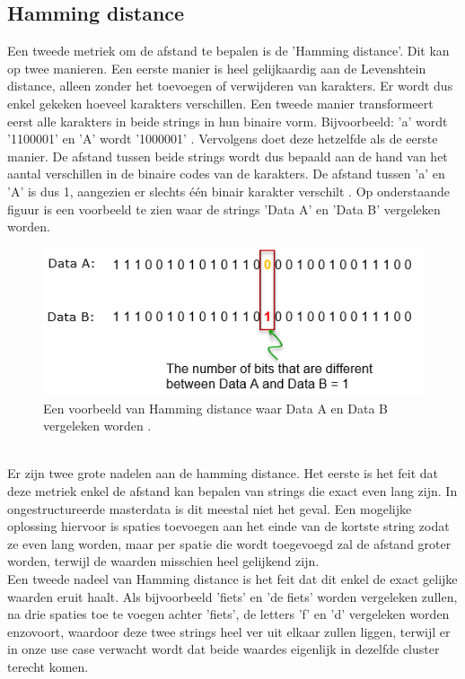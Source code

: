 \subsection{Hamming distance}
Een tweede metriek om de afstand te bepalen is de 'Hamming distance'. Dit kan op twee manieren. Een eerste manier is heel gelijkaardig aan de Levenshtein distance, alleen zonder het toevoegen of verwijderen van karakters. Er wordt dus enkel gekeken hoeveel karakters verschillen. Een tweede manier transformeert eerst alle karakters in beide strings in hun binaire vorm. Bijvoorbeeld: 'a' wordt '1100001' en 'A' wordt '1000001' \autocite{Includehelp}. Vervolgens doet deze hetzelfde als de eerste manier. De afstand tussen beide strings wordt dus bepaald aan de hand van het aantal verschillen in de binaire codes van de karakters. De afstand tussen 'a' en 'A' is dus 1, aangezien er slechts één binair karakter verschilt \autocite{Silva2022}. Op onderstaande figuur is een voorbeeld te zien waar de strings 'Data A' en 'Data B' vergeleken worden.
\begin{figure}[h]
    \centering
    \includegraphics[width=0.7\linewidth]{../foto's/hammingdistance}
    \caption{Een voorbeeld van Hamming distance waar Data A en Data B vergeleken worden \autocite{ShareTechnote}.}
    \label{fig:hamming_distance_voorbeeld}
\end{figure}
\\\indent
Er zijn twee grote nadelen aan de hamming distance. Het eerste is het feit dat deze metriek enkel de afstand kan bepalen van strings die exact even lang zijn. In ongestructureerde masterdata is dit meestal niet het geval. Een mogelijke oplossing hiervoor is spaties toevoegen aan het einde van de kortste string zodat ze even lang worden, maar per spatie die wordt toegevoegd zal de afstand groter worden, terwijl de waarden misschien heel gelijkend zijn.
\\\indent
Een tweede nadeel van Hamming distance is het feit dat dit enkel de exact gelijke waarden eruit haalt. Als bijvoorbeeld 'fiets' en 'de fiets' worden vergeleken zullen, na drie spaties toe te voegen achter 'fiets', de letters 'f' en 'd' vergeleken worden enzovoort, waardoor deze twee strings heel ver uit elkaar zullen liggen, terwijl er in onze use case verwacht wordt dat beide waardes eigenlijk in dezelfde cluster terecht komen.

